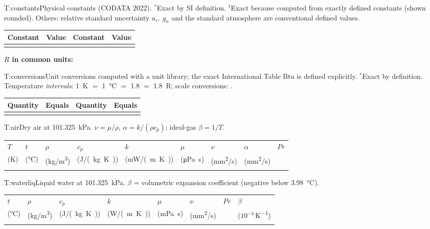 \begin{reftab}{T:constants}{Physical constants (CODATA 2022). $^\ast$Exact by SI definition. $^\dagger$Exact because computed from exactly defined constants (shown rounded). Others: relative standard uncertainty $u_r$. $g_n$ and the standard atmosphere are conventional defined values.}
\small
\begin{tabularx}{\textwidth}{@{}L{0.19\textwidth}L{0.29\textwidth}L{0.19\textwidth}Y@{}}
\toprule
Constant & Value & Constant & Value\\
\midrule
{}
\bottomrule
\end{tabularx}\end{reftab}
\textbf{$R$ in common units:} 

\begin{reftab}{T:conversions}{Unit conversions computed with a unit library; the exact International Table Btu is defined explicitly. $^\ast$Exact by definition. Temperature \emph{intervals}: \SI{1}{K} $=$ \SI{1}{\celsius} $=$ \SI{1.8}{\degF} $=$ \SI{1.8}{R}; scale conversions: .}
\small
\begin{tabularx}{\textwidth}{@{}L{0.25\textwidth}L{0.22\textwidth}L{0.27\textwidth}Y@{}}
\toprule
Quantity & Equals & Quantity & Equals\\
\midrule
{}
\bottomrule
\end{tabularx}\end{reftab}

\begin{reftab}{T:air}{Dry air at \SI{101.325}{kPa}. $\nu=\mu/\rho$, $\alpha=k/(\rho c_p)$; ideal-gas $\beta=1/T$.}
\small
\begin{tabularx}{\textwidth}{@{}YYYYYYYYY@{}}
\toprule
$T$ & $t$ & $\rho$ & $c_p$ & $k$ & $\mu$ & $\nu$ & $\alpha$ & $Pr$\\
(K) & (\si{\celsius}) & (\si{kg/m^3}) & (\si{J/(kg.K)}) & (\si{mW/(m.K)}) & (\si{\micro Pa.s}) & (\si{mm^2/s}) & (\si{mm^2/s}) & \\
\midrule
{}
\bottomrule
\end{tabularx}\end{reftab}

\begin{reftab}{T:waterliq}{Liquid water at \SI{101.325}{kPa}. $\beta$ = volumetric expansion coefficient (negative below \SI{3.98}{\celsius}).}
\small
\begin{tabularx}{\textwidth}{@{}YYYYYYYY@{}}
\toprule
$t$ & $\rho$ & $c_p$ & $k$ & $\mu$ & $\nu$ & $Pr$ & $\beta$\\
(\si{\celsius}) & (\si{kg/m^3}) & (\si{J/(kg.K)}) & (\si{W/(m.K)}) & (\si{mPa.s}) & (\si{mm^2/s}) & & ($10^{-4}$\,\si{K^{-1}})\\
\midrule
{}
\bottomrule
\end{tabularx}\end{reftab}


